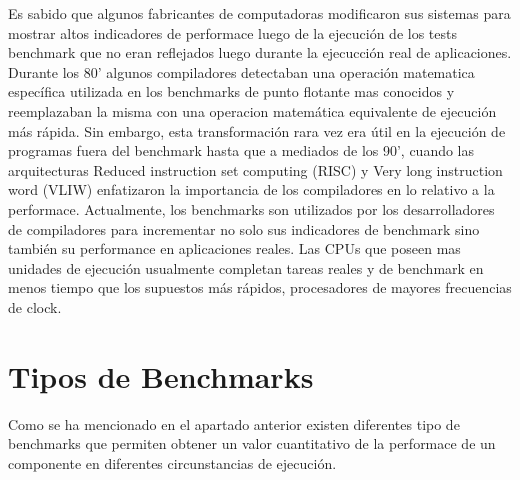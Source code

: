 	Es sabido que algunos fabricantes de computadoras modificaron sus sistemas para mostrar altos indicadores de performace luego de la ejecución de los
	tests benchmark que no eran reflejados luego durante la ejecucción real de aplicaciones. Durante los 80' algunos compiladores detectaban una
	operación matematica específica utilizada en los benchmarks de punto flotante mas conocidos y reemplazaban la misma con una operacion matemática
	equivalente de ejecución más rápida. Sin embargo, esta transformación rara vez era útil en la ejecución de programas fuera del benchmark hasta que a
	mediados de los 90', cuando las arquitecturas Reduced instruction set computing (RISC) y Very long instruction word (VLIW) enfatizaron la importancia
	de los compiladores en lo relativo a la performace. Actualmente, los benchmarks son utilizados por los desarrolladores de compiladores para
	incrementar no solo sus indicadores de benchmark sino también su performance en aplicaciones reales. Las CPUs que poseen mas unidades de ejecución
	usualmente completan tareas reales y de benchmark en menos tiempo que los supuestos más rápidos, procesadores de mayores frecuencias de clock.

	\section{Tipos de Benchmarks}
	Como se ha mencionado en el apartado anterior existen diferentes tipo de benchmarks que permiten obtener un valor cuantitativo de la performace de un
	componente en diferentes circunstancias de ejecución.
	
